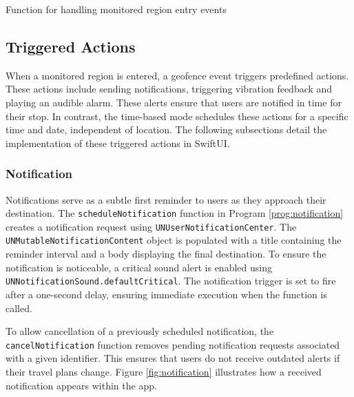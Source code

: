 \begin{program}[htbp]
\caption{Function for handling monitored region entry events}
\label{prog:didenterregion}
\end{program}

\subsection{Triggered Actions}
When a monitored region is entered, a geofence event triggers predefined actions. 
These actions include sending notifications, triggering vibration feedback and playing an audible alarm.
These alerts ensure that users are notified in time for their stop. 
In contrast, the time-based mode schedules these actions for a specific time and date, independent of location.
The following subsections detail the implementation of these triggered actions in SwiftUI.

\subsubsection{Notification}
Notifications serve as a subtle first reminder to users as they approach their destination. 
The \lstinline{scheduleNotification} function in Program \ref{prog:notification} creates a notification request using \lstinline{UNUserNotificationCenter}.
The \lstinline{UNMutableNotificationContent} object is populated with a title containing the reminder interval and a body displaying the final destination. 
To ensure the notification is noticeable, a critical sound alert is enabled using \lstinline{UNNotificationSound.defaultCritical}. 
The notification trigger is set to fire after a one-second delay, ensuring immediate execution when the function is called.

To allow cancellation of a previously scheduled notification, the \lstinline{cancelNotification} function removes pending notification requests associated with a given identifier. 
This ensures that users do not receive outdated alerts if their travel plans change.
Figure \ref{fig:notification} illustrates how a received notification appears within the app.

